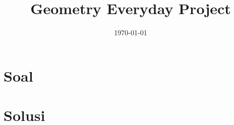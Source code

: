 

\title{Geometry Everyday Project}
\date{\today}



\maketitle

\renewcommand*\contentsname{Daftar Isi}
\tableofcontents

\newpage

\section{Soal}


\newpage
\section{Solusi}



